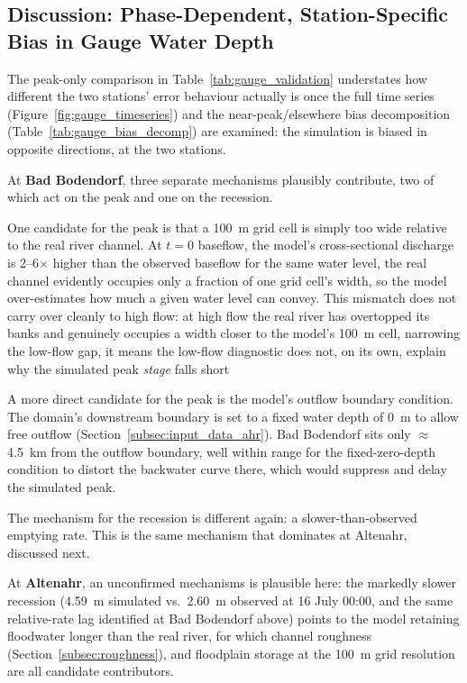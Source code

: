 \documentclass[12pt,a4paper]{report}
\begin{document}
{\subsection{Discussion: Phase-Dependent, Station-Specific Bias in Gauge Water Depth}
\label{subsec:discussion_gauge}
 
The peak-only comparison in Table~\ref{tab:gauge_validation} understates how different
the two stations' error behaviour actually is once the full time series
(Figure~\ref{fig:gauge_timeseries}) and the near-peak/elsewhere bias decomposition
(Table~\ref{tab:gauge_bias_decomp}) are examined: the simulation is biased in
opposite directions, at the two stations.
 
At \textbf{Bad Bodendorf}, three separate mechanisms plausibly contribute, two of which
act on the peak and one on the recession.
 
One candidate for the peak is that a 100~m grid cell is simply too wide relative to the
real river channel. At $t=0$ baseflow, the model's cross-sectional discharge is
2--6$\times$ higher than the observed baseflow for the same water level,  the real
channel evidently occupies only a fraction of one grid cell's width, so the model
over-estimates how much a given water level can convey. This mismatch does not carry
over cleanly to high flow: at high flow the real
river has overtopped its banks and genuinely occupies a width closer to the model's
100~m cell, narrowing the low-flow gap, it means the low-flow diagnostic
does not, on its own, explain why the simulated peak \emph{stage} falls short
 
A more direct candidate for the peak is the model's outflow boundary condition. The domain's downstream boundary is set to a fixed
water depth of 0~m to allow free outflow (Section~\ref{subsec:input_data_ahr}). Bad Bodendorf sits only $\approx$4.5~km from the
outflow boundary, well
within range for the fixed-zero-depth condition to distort the backwater curve
there, which would suppress and delay the simulated peak. 
 
The mechanism for the recession is different again: a slower-than-observed emptying
rate. This is the same mechanism that dominates at
Altenahr, discussed next.
 
At \textbf{Altenahr}, an unconfirmed mechanisms is plausible here: the markedly slower
recession (4.59~m simulated vs.\ 2.60~m observed at 16 July 00:00, and the same
relative-rate lag identified at Bad Bodendorf above) points to the model retaining
floodwater longer than the real river, for which channel roughness
(Section~\ref{subsec:roughness}), and floodplain storage at the 100~m grid
resolution are all candidate contributors.
 
}
\end{document}
